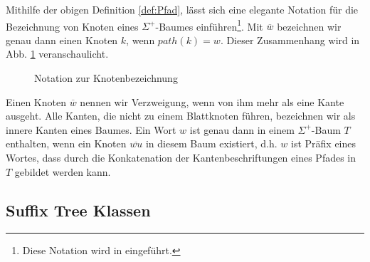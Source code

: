 \documentclass[12pt]{report}
\begin{document}
Mithilfe der obigen Definition \ref{def:Pfad}, lässt sich eine elegante Notation für die Bezeichnung von Knoten eines $\Sigma^+$-Baumes einführen\footnote{Diese Notation wird in \cite{Ukkonen1995} eingeführt.}. Mit $\overline{w}$ bezeichnen wir genau dann einen Knoten $k$, wenn $path(k) = w$. Dieser Zusammenhang wird in Abb. \ref{fig:NotationZurKnotenbezeichnung} veranschaulicht.

\begin{figure}[htb]
\centering
{}
\caption{Notation zur Knotenbezeichnung}
\label{fig:NotationZurKnotenbezeichnung}
\end{figure}

Einen Knoten $\overline{w}$ nennen wir Verzweigung, wenn von ihm mehr als eine Kante ausgeht. Alle Kanten, die nicht zu einem Blattknoten führen, bezeichnen wir als innere Kanten eines Baumes. Ein Wort $w$ ist genau dann in einem $\Sigma^+$-Baum $T$ enthalten, wenn ein Knoten $\overline{wu}$ in diesem Baum existiert, d.h. $w$ ist Präfix eines Wortes, dass durch die Konkatenation der Kantenbeschriftungen eines Pfades in $T$ gebildet werden kann.

\subsection{Suffix Tree Klassen}
\label{sec:suffixTreeKlassen}
\end{document}
